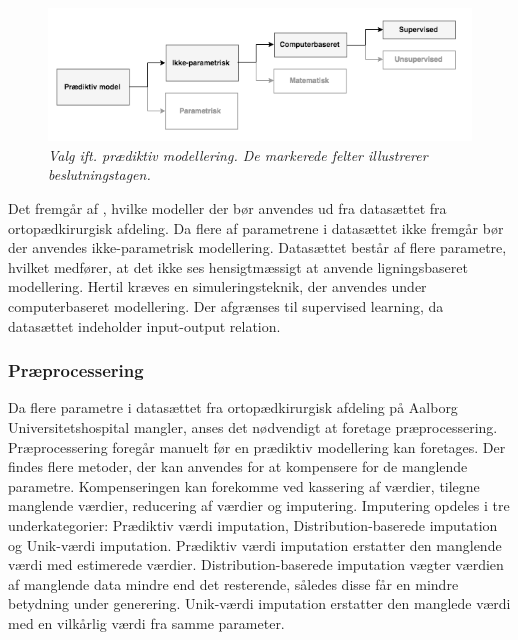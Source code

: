 \begin{figure}[H]
	\centering
	\includegraphics[scale=.73]{figures/praediktivmodel.png}
	\caption{\textit{Valg ift. prædiktiv modellering. De markerede felter illustrerer beslutningstagen.}}
	\label{praediktiv}
\end{figure}

\noindent 
Det fremgår af , hvilke modeller der bør anvendes ud fra datasættet fra ortopædkirurgisk afdeling.
Da flere af parametrene i datasættet ikke fremgår bør der anvendes ikke-parametrisk modellering. Datasættet består af flere parametre, hvilket medfører, at det ikke ses hensigtmæssigt at anvende ligningsbaseret modellering. Hertil kræves en simuleringsteknik, der anvendes under computerbaseret modellering. Der afgrænses til supervised learning, da datasættet indeholder input-output relation.


\subsubsection{Præprocessering}
Da flere parametre i datasættet fra ortopædkirurgisk afdeling på Aalborg Universitetshospital mangler, anses det nødvendigt at foretage præprocessering. Præprocessering foregår manuelt før en prædiktiv modellering kan foretages.
Der findes flere metoder, der kan anvendes for at kompensere for de manglende parametre. Kompenseringen kan forekomme ved kassering af værdier, tilegne manglende værdier, reducering af værdier og imputering. Imputering opdeles i tre underkategorier: Prædiktiv værdi imputation, Distribution-baserede imputation og Unik-værdi imputation. Prædiktiv værdi imputation erstatter den manglende værdi med estimerede værdier. Distribution-baserede imputation vægter værdien af manglende data mindre end det resterende, således disse får en mindre betydning under generering. Unik-værdi imputation  erstatter den manglede værdi med en vilkårlig værdi fra samme parameter.\cite{Saar2007} 


